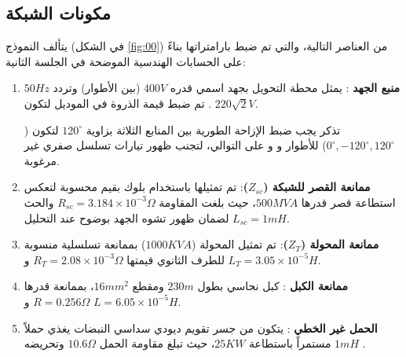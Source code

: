 
\subsection{مكونات الشبكة }
يتألف النموذج (في الشكل \ref{fig:00}) من العناصر التالية، والتي تم ضبط بارامتراتها بناءً على الحسابات الهندسية الموضحة في الجلسة الثانية:
\begin{enumerate}
  \item \textbf{منبع الجهد }:
  يمثل محطة التحويل بجهد اسمي قدره $400 V$ (بين الأطوار) وتردد $50 Hz$. تم ضبط قيمة الذروة في الموديل لتكون $220\sqrt{2} V$.\\[-10pt]
  
\begin{arabicbox}{تذكر}
  يجب ضبط الإزاحة الطورية بين المنابع الثلاثة بزاوية $120^\circ$ لتكون ($0^\circ, -120^\circ, 120^\circ$) للأطوار  و  و  على التوالي، لتجنب ظهور تيارات تسلسل صفري غير مرغوبة.
\end{arabicbox}
 

  \item \textbf{ممانعة القصر للشبكة ($Z_{sc}$)}: تم تمثيلها باستخدام بلوك  بقيم محسوبة لتعكس استطاعة قصر قدرها $500 MVA$، حيث بلغت المقاومة $R_{sc} = 3.184 \times 10^{-3} \Omega$ والحث $L_{sc} = 1 mH$ لضمان ظهور تشوه الجهد بوضوح عند التحليل.\newpage
  \item \textbf{ممانعة المحولة ($Z_{T}$)}:
  تم تمثيل المحولة ($1000 KVA$) بممانعة تسلسلية منسوبة للطرف الثانوي قيمتها $R_T = 2.08 \times 10^{-3} \Omega$ و $L_T = 3.05 \times 10^{-5} H$.
  \item \textbf{ممانعة الكبل }: كبل نحاسي بطول $230 m$ ومقطع $16 mm^2$، بممانعة قدرها $R = 0.256 \Omega$ و $L = 6.05 \times 10^{-5} H$.
  \item \textbf{الحمل غير الخطي }:
  يتكون من جسر تقويم ديودي سداسي النبضات  يغذي حملاً مستمراً  باستطاعة $25 KW$، حيث تبلغ مقاومة الحمل $10.6 \Omega$ وتحريضه $1 mH$ .
\end{enumerate}
